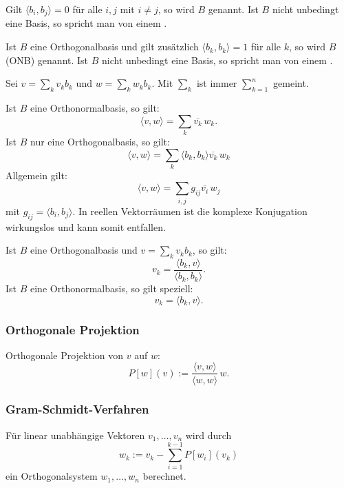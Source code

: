 {}
Gilt $\langle b_i,b_j\rangle=0$
für alle $i,j$ mit $i\ne j$, so wird $B$ 
genannt. Ist $B$ nicht unbedingt eine Basis, so spricht man von einem 
.

{}
Ist $B$ eine Orthogonalbasis und gilt
zusätzlich $\langle b_k,b_k\rangle=1$ für alle $k$, so wird
$B$  (ONB) genannt. Ist $B$ nicht unbedingt
eine Basis,  so spricht man von einem .

Sei $v=\sum_k v_kb_k$ und $w=\sum_k w_kb_k$.
Mit $\sum_k$ ist immer $\sum_{k=1}^n$ gemeint.

Ist $B$ eine Orthonormalbasis, so gilt:
\begin{equation}
\langle v,w\rangle = \sum_k \overline{v_k}\,w_k.
\end{equation}
Ist $B$ nur eine Orthogonalbasis, so gilt:
\begin{equation}
\langle v,w\rangle = \sum_k \langle b_k,b_k\rangle \overline{v_k}\,w_k
\end{equation}
Allgemein gilt:
\begin{equation}
\langle v,w\rangle = \sum_{i,j} g_{ij} \overline{v_i}\,w_j
\end{equation}
mit $g_{ij}=\langle b_i,b_j\rangle$. In reellen Vektorräumen
ist die komplexe Konjugation wirkungslos und kann somit entfallen.

Ist $B$ eine Orthogonalbasis und $v=\sum_k v_k b_k$, so gilt:
\begin{equation}
v_k = \frac{\langle b_k,v\rangle}{\langle b_k,b_k\rangle}.
\end{equation}
Ist $B$ eine Orthonormalbasis, so gilt speziell:
\begin{equation}
v_k = \langle b_k,v\rangle.
\end{equation}


\subsubsection{Orthogonale Projektion}
Orthogonale Projektion von $v$ auf $w$:
\begin{equation}
P[w](v) := \frac{\langle v,w\rangle}{\langle w,w\rangle}\,w.
\end{equation}
\subsubsection{Gram-Schmidt-Verfahren}
Für linear unabhängige Vektoren $v_1,\ldots,v_n$
wird durch%
\begin{equation}
w_k := v_k - \sum_{i=1}^{k-1} P[w_i](v_k)
\end{equation}
ein Orthogonalsystem $w_1,\ldots,w_n$ berechnet.

